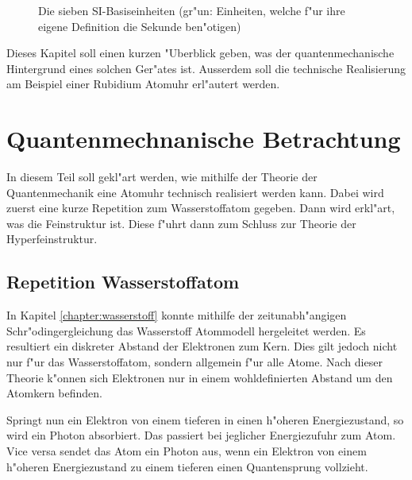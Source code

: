 \begin{refsection}
\begin{figure}
  \caption{Die sieben SI-Basiseinheiten \cite{wiki:si} (gr"un: Einheiten, welche f"ur
    ihre eigene Definition die Sekunde ben"otigen)}
  \label{fig:siBasis}
\end{figure}

Dieses Kapitel soll einen kurzen "Uberblick geben, was der
quantenmechanische Hintergrund eines solchen Ger"ates ist. Ausserdem
soll die technische Realisierung am Beispiel einer Rubidium Atomuhr
erl"autert werden.

\section{Quantenmechnanische Betrachtung}

In diesem Teil soll gekl"art werden, wie mithilfe der Theorie der
Quantenmechanik eine Atomuhr technisch realisiert werden kann. Dabei
wird zuerst eine kurze Repetition zum Wasserstoffatom gegeben. Dann
wird erkl"art, was die Feinstruktur ist. Diese f"uhrt dann zum Schluss
zur Theorie der Hyperfeinstruktur.

\subsection{Repetition Wasserstoffatom}
In Kapitel \ref{chapter:wasserstoff} konnte mithilfe der
zeitunabh"angigen Schr"odingergleichung das Wasserstoff Atommodell
hergeleitet werden.  Es resultiert ein diskreter Abstand der
Elektronen zum Kern.  Dies gilt jedoch nicht nur f"ur das
Wasserstoffatom, sondern allgemein f"ur alle Atome.  Nach dieser
Theorie k"onnen sich Elektronen nur in einem wohldefinierten Abstand
um den Atomkern befinden.

Springt nun ein Elektron von einem tieferen in einen h"oheren
Energiezustand, so wird ein Photon absorbiert.  Das passiert bei
jeglicher Energiezufuhr zum Atom.  Vice versa sendet das Atom ein
Photon aus, wenn ein Elektron von einem h"oheren Energiezustand zu
einem tieferen einen Quantensprung vollzieht.


\end{refsection}
